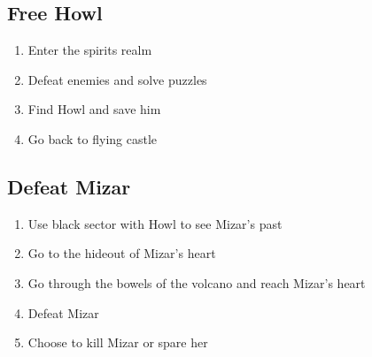\subsection{Free Howl}
\begin{enumerate}
\item Enter the spirits realm
\item Defeat enemies and solve puzzles
\item Find Howl and save him
\item Go back to flying castle
\end{enumerate}

\subsection{Defeat Mizar}
\begin{enumerate}
\item Use black sector with Howl to see Mizar’s past
\item Go to the hideout of Mizar’s heart
\item Go through the bowels of the volcano and reach Mizar’s heart
\item Defeat Mizar
\item Choose to kill Mizar or spare her
\end{enumerate}
